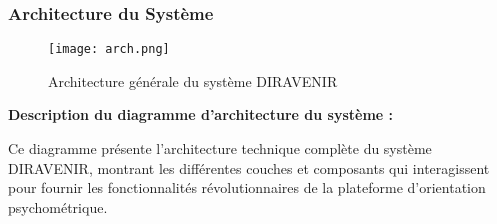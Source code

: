 \documentclass[12pt,a4paper]{report}
\begin{document}
\subsubsection{Architecture du Système}

\begin{figure}[H]
\centering
\texttt{[image: arch.png]}
\caption{Architecture générale du système DIRAVENIR}
\label{fig:diagramme_architecture_systeme}
\end{figure}

\textbf{Description du diagramme d'architecture du système :}

Ce diagramme présente l'architecture technique complète du système DIRAVENIR, montrant les différentes couches et composants qui interagissent pour fournir les fonctionnalités révolutionnaires de la plateforme d'orientation psychométrique.
\end{document}
